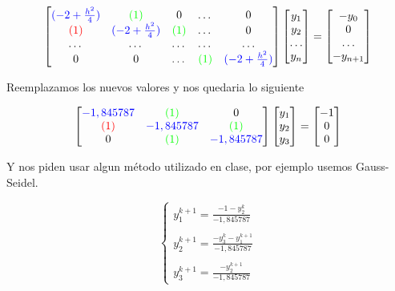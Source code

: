 \[
\begin{bmatrix}
\textcolor{blue}{(-2 + \frac{h^2}{4})} & \textcolor{green}{(1)} & 0 & \dots & 0 \\
\textcolor{red}{(1)} & \textcolor{blue}{(-2 + \frac{h^2}{4})} & \textcolor{green}{(1)} & \dots & 0 \\
\dots  & \dots  & \dots  & \dots & \dots  \\
0 & 0 & \dots & \textcolor{green}{(1)} & \textcolor{blue}{(-2 + \frac{h^2}{4})}
\end{bmatrix}
\begin{bmatrix}
y_1 \\ y_2 \\ \dots \\ y_n 
\end{bmatrix}
=
\begin{bmatrix}
-y_0 \\ 0 \\ \dots \\ -y_{n+1}
\end{bmatrix}
\]

Reemplazamos los nuevos valores y nos quedaria lo siguiente

\[
\begin{bmatrix}
\textcolor{blue}{-1,845787} & \textcolor{green}{(1)} & 0 \\
\textcolor{red}{(1)} & \textcolor{blue}{-1,845787} & \textcolor{green}{(1)}  \\
0 & \textcolor{green}{(1)} & \textcolor{blue}{-1,845787}
\end{bmatrix}
\begin{bmatrix}
y_1 \\ y_2 \\ y_3 
\end{bmatrix}
=
\begin{bmatrix}
-1 \\ 0 \\ 0
\end{bmatrix}
\]


Y nos piden usar algun método utilizado en clase, por ejemplo usemos Gauss-Seidel. 



\begin{equation}
\left\{
\begin{array}{l}
y^{k+1}_1 = \frac{-1 - y^k_2}{-1,845787} \\ \\
y^{k+1}_2 = \frac{-y^k_3 - y^{k+1}_1}{-1,845787} \\ \\
y^{k+1}_3 = \frac{ - y^{k+1}_2}{-1,845787} 
\end{array}
\right.
\end{equation}


